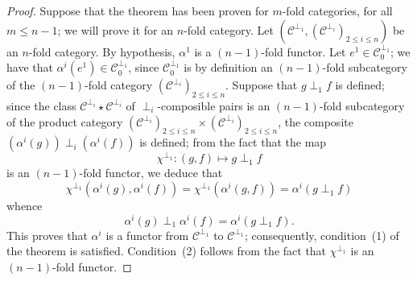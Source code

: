 \documentclass[a4paper,fleqn]{article}
\theoremstyle{plain}
\theoremstyle{definition}
\renewcommand{\leq}{\leqslant}
\newcommand{\oldpage}[1]{{\marginpar{\footnotesize$\bigg\vert$\,\,\,\,\textit{p.~#1}}}}
\newcommand{\CC}{\mathcal{C}}
\begin{document}
\begin{proof}
  Suppose that the theorem has been proven for $m$-fold categories, for all $m\leq n-1$; we will prove it for an $n$-fold category.
  Let $(\CC^{\perp_1},(\CC^{\perp_i})_{2\leq i\leq n})$ be an $n$-fold category.
  By hypothesis, $\alpha^1$ is a $(n-1)$-fold functor.
\oldpage{69}
  Let $e^1\in\CC_0^{\perp_1}$;
  we have that $\alpha^i(e^1)\in\CC_0^{\perp_1}$, since $\CC_0^{\perp_1}$ is by definition an $(n-1)$-fold subcategory of the $(n-1)$-fold category $(\CC^{\perp_i})_{2\leq i\leq n}$.
  Suppose that $g\perp_1 f$ is defined;
  since the class $\CC^{\perp_i}\star\CC^{\perp_i}$ of $\perp_i$-composible pairs is an $(n-1)$-fold subcategory of the product category $(\CC^{\perp_i})_{2\leq i\leq n}\times(\CC^{\perp_i})_{2\leq i\leq n}$, the composite $(\alpha^i(g))\perp_i(\alpha^i(f))$ is defined;
  from the fact that the map
  \[
    \chi^{\perp_1}
    \colon (g,f)
    \longmapsto g\perp_1f
  \]
  is an $(n-1)$-fold functor, we deduce that
  \[
    \chi^{\perp_1}(\alpha^i(g),\alpha^i(f))
    = \chi^{\perp_1}(\alpha^i(g,f))
    = \alpha^i(g\perp_1 f)
  \]
  whence
  \[
    \alpha^i(g)\perp_1\alpha^i(f)
    = \alpha^i(g\perp_1 f).
  \]
  This proves that $\alpha^i$ is a functor from $\CC^{\perp_1}$ to $\CC^{\perp_1}$;
  consequently, condition~(1) of the theorem is satisfied.
  Condition~(2) follows from the fact that $\chi^{\perp_1}$ is an $(n-1)$-fold functor.


\end{proof}
\end{document}
